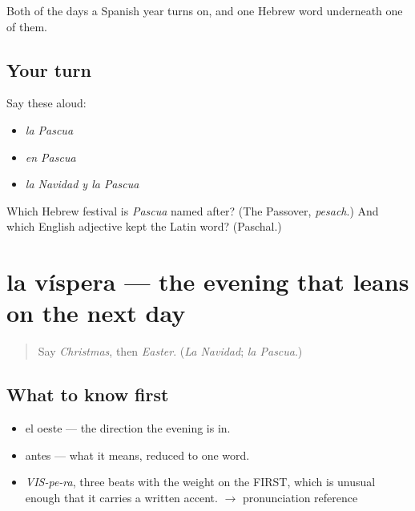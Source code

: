\begin{grammarlens}[title={What you've built}]
Both of the days a Spanish year turns on, and one Hebrew word underneath one of them.
\end{grammarlens}

\subsection*{Your turn}
Say these aloud:

\begin{itemize}
\raggedright
  \item \emph{la Pascua}
  \item \emph{en Pascua}
  \item \emph{la Navidad y la Pascua}
\end{itemize}

\begin{tcolorbox}[breakable,colback=teal!4,colframe=teal!35!black,title={Before you move on}]
Which Hebrew festival is \emph{Pascua} named after? (The Passover, \emph{pesach}.) And which English adjective kept the Latin word? (Paschal.)
\end{tcolorbox}
\section[la víspera]{la víspera — the evening that leans on the next day}

\label{lesson:ES-C357-vispera}



\begin{quote}
Say \emph{Christmas}, then \emph{Easter}. (\emph{La Navidad}; \emph{la Pascua}.)
\end{quote}

\subsection*{What to know first}
\begin{itemize}
\raggedright
  \item el oeste — the direction the evening is in.
  \item antes — what it means, reduced to one word.
\end{itemize}

\begin{sounds}
\begin{itemize}
\raggedright
  \item \emph{VIS-pe-ra}, three beats with the weight on the FIRST, which is unusual enough that it carries a written accent. $\to$ pronunciation reference
\end{itemize}
\end{sounds}

